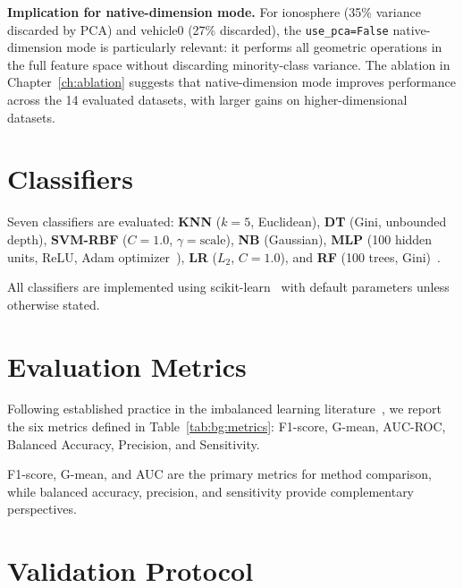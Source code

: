 \textbf{Implication for native-dimension mode.}
For ionosphere (35\% variance discarded by PCA) and vehicle0 (27\% discarded), the \texttt{use\_pca=False} native-dimension mode is particularly relevant: it performs all geometric operations in the full feature space without discarding minority-class variance.
The ablation in Chapter~\ref{ch:ablation} suggests that native-dimension mode improves performance across the 14 evaluated datasets, with larger gains on higher-dimensional datasets.


\section{Classifiers}
\label{sec:setup:classifiers}

Seven classifiers are evaluated: \textbf{KNN} ($k=5$, Euclidean), \textbf{DT} (Gini, unbounded depth), \textbf{SVM-RBF} ($C=1.0$, $\gamma=\text{scale}$), \textbf{NB} (Gaussian), \textbf{MLP} (100 hidden units, ReLU, Adam optimizer~\cite{buda2018systematic}), \textbf{LR} ($L_2$, $C=1.0$), and \textbf{RF} (100 trees, Gini)~\cite{breiman2001random}.

All classifiers are implemented using scikit-learn~\cite{pedregosa2011scikit} with default parameters unless otherwise stated.


\section{Evaluation Metrics}
\label{sec:setup:metrics}

Following established practice in the imbalanced learning literature~\cite{he2009learning, branco2016survey, fernandez2018learning}, we report the six metrics defined in Table~\ref{tab:bg:metrics}: F1-score, G-mean, AUC-ROC, Balanced Accuracy, Precision, and Sensitivity.

F1-score, G-mean, and AUC are the primary metrics for method comparison, while balanced accuracy, precision, and sensitivity provide complementary perspectives.


\section{Validation Protocol}
\label{sec:setup:validation}

